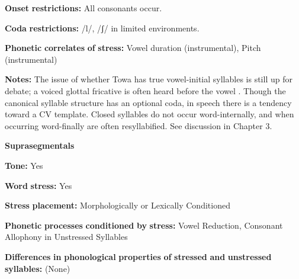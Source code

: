 \begin{styleBody}
\textbf{Onset} \textbf{restrictions:} All consonants occur.
\end{styleBody}

\begin{styleBody}
\textbf{Coda} \textbf{restrictions:} /l/, /ʃ/ in limited environments.
\end{styleBody}

\begin{styleBody}
\textbf{Phonetic} \textbf{correlates} \textbf{of} \textbf{stress:} Vowel duration (instrumental), Pitch (instrumental)
\end{styleBody}

\begin{styleBody}
\textbf{Notes:} The issue of whether Towa has true vowel-initial syllables is still up for debate; a voiced glottal fricative is often heard before the vowel \citep[22-23]{Yumitani1998}. Though the canonical syllable structure has an optional coda, in speech there is a tendency toward a CV template. Closed syllables do not occur word-internally, and when occurring word-finally are often resyllabified. See discussion in Chapter 3.
\end{styleBody}

\begin{styleBody}
\textbf{Suprasegmentals}
\end{styleBody}

\begin{styleBody}
\textbf{Tone:} Yes
\end{styleBody}

\begin{styleBody}
\textbf{Word} \textbf{stress:} Yes
\end{styleBody}

\begin{styleBody}
\textbf{Stress} \textbf{placement:} Morphologically or Lexically Conditioned
\end{styleBody}

\begin{styleBody}
\textbf{Phonetic} \textbf{processes} \textbf{conditioned} \textbf{by} \textbf{stress:} Vowel Reduction, Consonant Allophony in Unstressed Syllables
\end{styleBody}

\begin{styleBody}
\textbf{Differences} \textbf{in} \textbf{phonological} \textbf{properties} \textbf{of} \textbf{stressed} \textbf{and} \textbf{unstressed} \textbf{syllables:} (None)
\end{styleBody}

